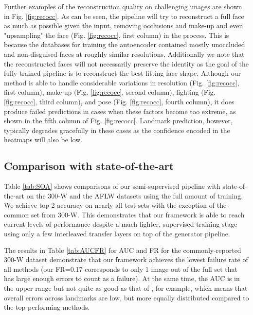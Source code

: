 \documentclass[10pt,twocolumn,letterpaper]{article}
\begin{document}
Further examples of the reconstruction quality on challenging images are shown in Fig. \ref{fig:recocc}. As can be seen, the pipeline will try to reconstruct a full face as much as possible given the input, removing occlusions and make-up and even "upsampling" the face (Fig. \ref{fig:recocc}, first column) in the process. This is because the databases for training the autoencoder contained mostly unoccluded and non-disguised faces at roughly similar resolutions. Additionally we note that the reconstructed faces will not necessarily preserve the identity as the goal of the fully-trained pipeline is to reconstruct the best-fitting face shape. Although our method is able to handle considerable variations in resolution  (Fig. \ref{fig:recocc}, first column), make-up  (Fig. \ref{fig:recocc}, second column), lighting  (Fig. \ref{fig:recocc}, third column), and pose  (Fig. \ref{fig:recocc}, fourth column), it does produce failed predictions in cases when these factors become too extreme, as shown in the fifth column of Fig. \ref{fig:recocc}. Landmark prediction, however, typically degrades gracefully in these cases as the confidence encoded in the heatmaps will also be low.


\vspace{-0.1cm}\subsection{Comparison with state-of-the-art}

Table \ref{tab:SOA} shows comparisons of our semi-supervised pipeline with state-of-the-art on the 300-W and the AFLW datasets using the full amount of training. We achieve top-2 accuracy on nearly all test sets with the exception of the common set from 300-W. This demonstrates that our framework is able to reach current levels of performance despite a much lighter, supervised training stage using only a few interleaved transfer layers on top of the generator pipeline.

The results in Table \ref{tab:AUCFR} for AUC and FR for the commonly-reported 300-W dataset demonstrate that our framework achieves the lowest failure rate of all methods (our FR=0.17 corresponds to only 1 image out of the full set that has large enough errors to count as a failure). At the same time, the AUC is in the upper range but not quite as good as that of \cite{Wu2018}, for example, which means that overall errors across landmarks are low, but more equally distributed compared to the top-performing methods.
\end{document}
